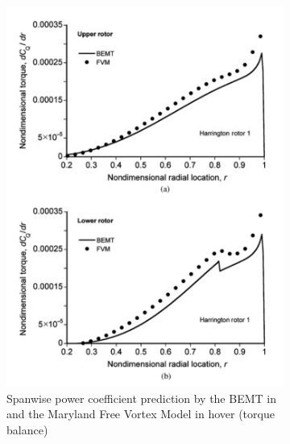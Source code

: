 \begin{figure}[H]
\captionsetup[subfigure]{justification=centering}
\begin{subfigure}[t]{0.5\textwidth}
    \centering
    \includegraphics[width=\textwidth]{Figures/Leishman_CP.png}
    \caption{Spanwise power coefficient prediction by the BEMT in \cite{BEMT} and the Maryland Free Vortex Model in hover (torque balance)}
    \label{fig:blade2d}
\end{subfigure}
\begin{subfigure}[t]{0.5\textwidth}
    \centering

\end{subfigure}
\end{figure}
